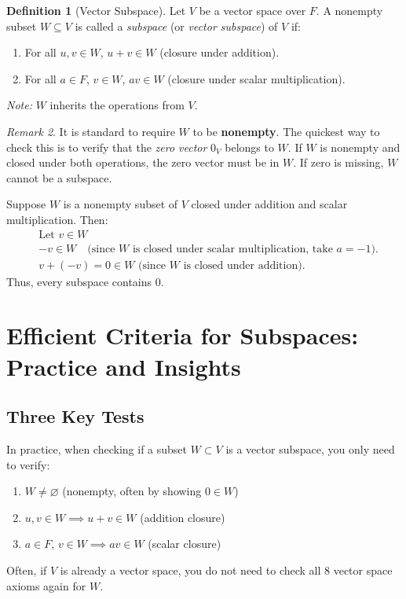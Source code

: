 \documentclass[11pt,a4paper]{article}
\theoremstyle{definition}
\newtheorem{definition}{Definition}[section]
\theoremstyle{plain}
\theoremstyle{remark}
\newtheorem{remark}[definition]{Remark}
\begin{document}
\begin{definition}[Vector Subspace]
Let $V$ be a vector space over $F$. A nonempty subset $W \subseteq V$ is called a \emph{subspace} (or \emph{vector subspace}) of $V$ if:
\begin{enumerate}[label=(\roman*)]
    \item For all $u, v \in W$, $u+v \in W$ (closure under addition).
    \item For all $a \in F$, $v \in W$, $a v \in W$ (closure under scalar multiplication).
\end{enumerate}
\textit{Note:} $W$ inherits the operations from $V$.
\end{definition}

\begin{remark}
It is standard to require $W$ to be \textbf{nonempty}. The quickest way to check this is to verify that the \emph{zero vector} $0_V$ belongs to $W$. If $W$ is nonempty and closed under both operations, the zero vector must be in $W$. If zero is missing, $W$ cannot be a subspace.
\end{remark}

\begin{original_example}[title=Nonempty Subspaces]
Suppose $W$ is a nonempty subset of $V$ closed under addition and scalar multiplication. Then:
\begin{align*}
    & \text{Let } v \in W \\
    & -v \in W \quad \text{(since } W \text{ is closed under scalar multiplication, take } a = -1).\\
    & v + (-v) = 0 \in W \text{ (since } W \text{ is closed under addition).}
\end{align*}
Thus, every subspace contains $0$.
\end{original_example}

\section{Efficient Criteria for Subspaces: Practice and Insights}

\subsection{Three Key Tests}

In practice, when checking if a subset $W\subset V$ is a vector subspace, you only need to verify:
\begin{enumerate}
    \item $W \neq \varnothing$ (nonempty, often by showing $0 \in W$)
    \item $u, v \in W \implies u+v \in W$ (addition closure)
    \item $a \in F$, $v \in W \implies a v \in W$ (scalar closure)
\end{enumerate}
Often, if $V$ is already a vector space, you do not need to check all 8 vector space axioms again for $W$.
\end{document}
